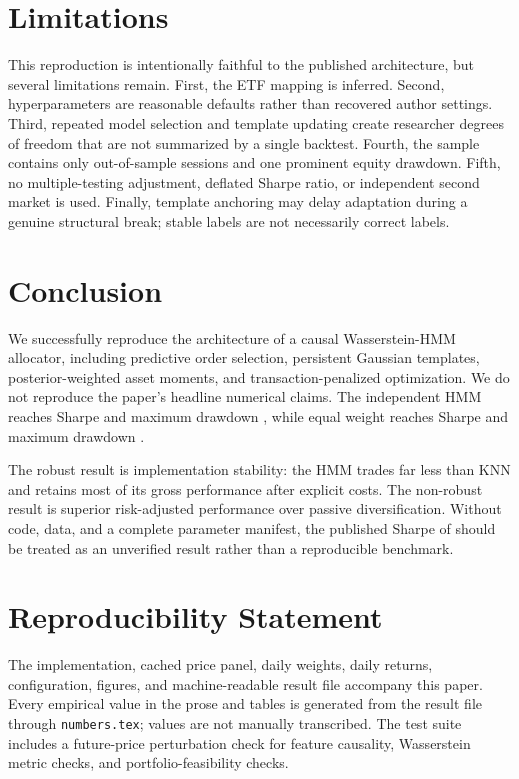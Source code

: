 \documentclass[11pt]{article}
\begin{document}
\section{Limitations}

This reproduction is intentionally faithful to the published architecture, but several limitations remain. First, the ETF mapping is inferred. Second, hyperparameters are reasonable defaults rather than recovered author settings. Third, repeated model selection and template updating create researcher degrees of freedom that are not summarized by a single backtest. Fourth, the sample contains only \OOSObs{} out-of-sample sessions and one prominent equity drawdown. Fifth, no multiple-testing adjustment, deflated Sharpe ratio, or independent second market is used. Finally, template anchoring may delay adaptation during a genuine structural break; stable labels are not necessarily correct labels.

\section{Conclusion}

We successfully reproduce the architecture of a causal Wasserstein-HMM allocator, including predictive order selection, persistent Gaussian templates, posterior-weighted asset moments, and transaction-penalized optimization. We do not reproduce the paper's headline numerical claims. The independent HMM reaches Sharpe \RepHMMSharpe{} and maximum drawdown \RepHMMMaxDD{}, while equal weight reaches Sharpe \RepEqualSharpe{} and maximum drawdown \RepEqualMaxDD{}.

The robust result is implementation stability: the HMM trades far less than KNN and retains most of its gross performance after explicit costs. The non-robust result is superior risk-adjusted performance over passive diversification. Without code, data, and a complete parameter manifest, the published Sharpe of \PubHMMSharpe{} should be treated as an unverified result rather than a reproducible benchmark.

\section*{Reproducibility Statement}

The implementation, cached price panel, daily weights, daily returns, configuration, figures, and machine-readable result file accompany this paper. Every empirical value in the prose and tables is generated from the result file through \texttt{numbers.tex}; values are not manually transcribed. The test suite includes a future-price perturbation check for feature causality, Wasserstein metric checks, and portfolio-feasibility checks.
\end{document}

